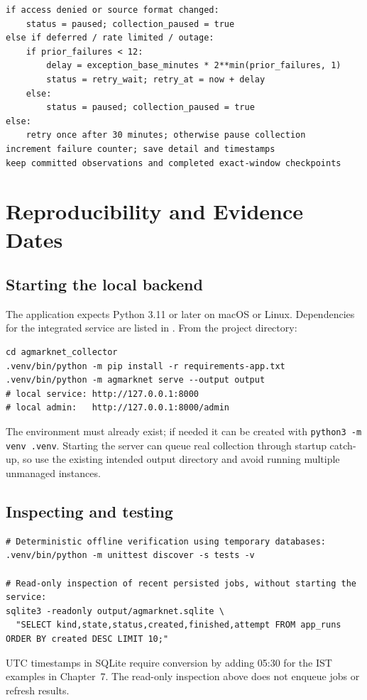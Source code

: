 \documentclass[12pt,a4paper,oneside]{report}
\numberwithin{equation}{chapter}
\numberwithin{figure}{chapter}
\numberwithin{table}{chapter}
\theoremstyle{definition}
\begin{document}
\begin{lstlisting}[caption={Failure transition after a running job, simplified}]
if access denied or source format changed:
    status = paused; collection_paused = true
else if deferred / rate limited / outage:
    if prior_failures < 12:
        delay = exception_base_minutes * 2**min(prior_failures, 1)
        status = retry_wait; retry_at = now + delay
    else:
        status = paused; collection_paused = true
else:
    retry once after 30 minutes; otherwise pause collection
increment failure counter; save detail and timestamps
keep committed observations and completed exact-window checkpoints
\end{lstlisting}

\chapter{Reproducibility and Evidence Dates}
\section*{Starting the local backend}
The application expects Python 3.11 or later on macOS or Linux. Dependencies for the integrated service are listed in . From the project directory:
\begin{lstlisting}
cd agmarknet_collector
.venv/bin/python -m pip install -r requirements-app.txt
.venv/bin/python -m agmarknet serve --output output
# local service: http://127.0.0.1:8000
# local admin:   http://127.0.0.1:8000/admin
\end{lstlisting}
The environment must already exist; if needed it can be created with \texttt{python3 -m venv .venv}. Starting the server can queue real collection through startup catch-up, so use the existing intended output directory and avoid running multiple unmanaged instances.

\section*{Inspecting and testing}
\begin{lstlisting}
# Deterministic offline verification using temporary databases:
.venv/bin/python -m unittest discover -s tests -v

# Read-only inspection of recent persisted jobs, without starting the service:
sqlite3 -readonly output/agmarknet.sqlite \
  "SELECT kind,state,status,created,finished,attempt FROM app_runs ORDER BY created DESC LIMIT 10;"
\end{lstlisting}
UTC timestamps in SQLite require conversion by adding 05:30 for the IST examples in Chapter~7. The read-only inspection above does not enqueue jobs or refresh results.
\end{document}
